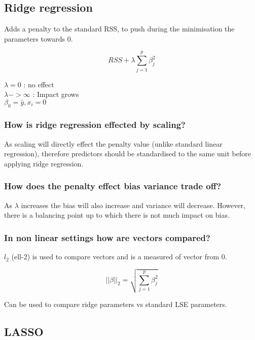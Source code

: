 \documentclass[11pt]{scrartcl} %
\begin{document}
\subsection{Ridge regression}

Adds a penalty to the standard RSS, to push during the minimisation the parameters towards 0.

\begin{equation}
	RSS + \lambda \sum^p_{j=1}{\beta^2_j}
\end{equation}

\(\lambda =0\) : no effect\\
\(\lambda ->\infty \) : Impact grows\\
\(\beta_0 = \bar{y},x_i=0\) 

\subsubsection{How is ridge regression effected by scaling?}

As scaling will directly effect the penalty value (unlike standard linear regression), therefore
predictors should be standardised to the same unit before applying ridge regression.

\subsubsection{How does the penalty effect bias variance trade off?}

As \(\lambda\) increases the bias will also increase and variance will decrease. However, there
is a balancing point up to which there is not much impact on bias.

\subsubsection{In non linear settings how are vectors compared?}

\(l_2\) (ell-2) is used to compare vectors and is a measured of vector from 0.

\begin{equation}
	||\beta||_2=\sqrt{\sum^p_{j=1}{\beta_j^2}}
\end{equation}

Can be used to compare ridge parameters vs standard LSE parameters.

\subsection{LASSO}
\end{document}
